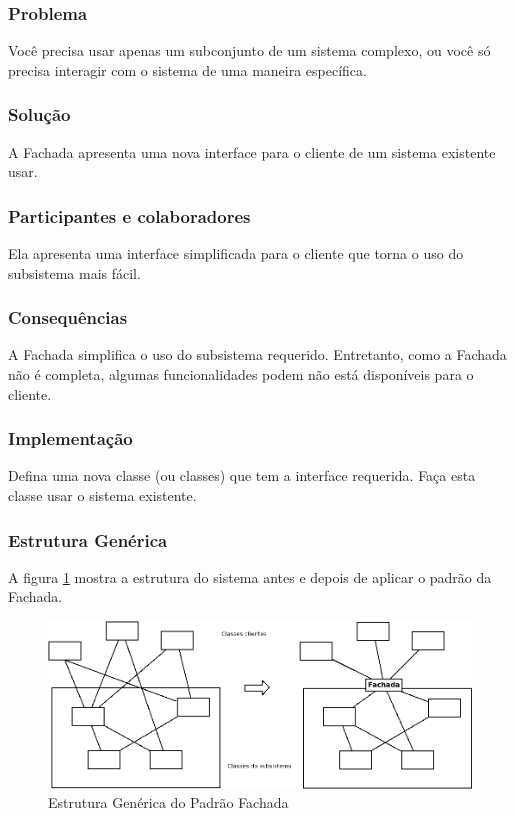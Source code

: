 \subsubsection{Problema}
Você precisa usar apenas um subconjunto de um sistema complexo, ou você só precisa interagir com o sistema de uma maneira específica.

\subsubsection{Solução}
A Fachada apresenta uma nova interface para o cliente de um sistema existente usar.

\subsubsection{Participantes e colaboradores}
Ela apresenta uma interface simplificada para o cliente que torna o uso do subsistema mais fácil.

\subsubsection{Consequências}
A Fachada simplifica o uso do subsistema requerido. Entretanto, como a Fachada não é completa, algumas funcionalidades podem não está disponíveis para o cliente.

\subsubsection{Implementação}
Defina uma nova classe (ou classes) que tem a interface requerida. Faça esta classe usar o sistema existente.

\subsubsection{Estrutura Genérica}
A figura \ref{fig:fachada} mostra a estrutura do sistema antes e depois de aplicar o padrão da Fachada.

\begin{figure}[h]
\begin{center}
\includegraphics[scale=0.42]{fachada.png}
\caption{Estrutura Genérica do Padrão Fachada}\label{fig:fachada}
\end{center}
\end{figure}

